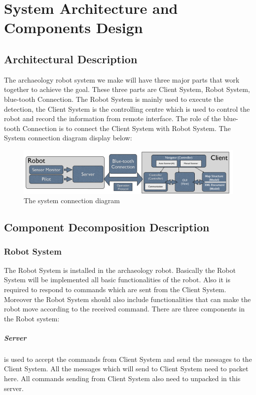 \documentclass[11pt, a4paper]{report}
\begin{document}


\pagebreak


\chapter{System Architecture and Components Design}%
\label{cha:SACD}


\section{Architectural Description}
The archaeology robot system we make will have three major parts that work together to achieve the goal. These three parts are Client System, Robot System, blue-tooth Connection. The Robot System is mainly used to execute the detection, the Client System is the controlling centre which is used to control the robot and record the information from remote interface. The role of the blue-tooth Connection is to connect the Client System with Robot System. The System connection diagram display below: 
\begin{figure}[h]
  \centering
    \includegraphics[width=16cm]{System.png}
  \caption{The system connection diagram}
\end{figure}
\section{Component Decomposition Description}
\subsection{Robot System}
The Robot System is installed in the archaeology robot. Basically the Robot System will be implemented all basic functionalities of the robot. Also it is required to respond to commands which are sent from the Client System. Moreover the Robot System should also include functionalities that can make the robot move according to the received command. There are three components in the Robot system:
\paragraph {Server} is used to accept the commands from Client System and send the messages to the Client System. All the messages which will send to Client System need to packet here. All commands sending from Client System also need to unpacked in this server.
\end{document}
